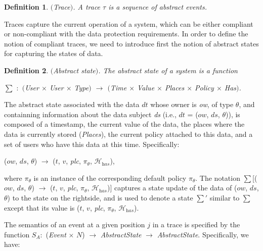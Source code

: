 \documentclass[a4paper]{article}
\newtheorem{ttd}{Definition}
\begin{document}
\begin{ttd} $($Trace$)$. 
A trace $\tau$ is a sequence of abstract events.  
\end{ttd}

Traces capture the current operation of a system, which can be either compliant or non-compliant with the data protection requirements.     
In order to define the notion of compliant traces, we need to introduce first the notion of abstract states for capturing the states of data.        

\begin{ttd} $($Abstract state$)$.
The abstract state of a system is a function 

\noindent $\sum$ $:$ $($\textit{User} $\times$ \textit{User} $\times$ \textit{Type}$)$ 
$\rightarrow$ $($\textit{Time} $\times$ \textit{Value} $\times$ \textit{Places} $\times$ \textit{Policy} $\times$ \textit{Has}$)$. 
\end{ttd}

The abstract state associated with the data $dt$ whose owner is \textit{ow}, of type $\theta$, and containning information about the data subject \textit{ds} (i.e., $dt$ = ($ow$, $ds$, $\theta$)), is composed of a timestamp, the current value of the data, the places where the data is currently stored (\textit{Places}), the current policy attached to this data, and a set of users who have this data at this time. Specifically:  

\begin{center} 
($ow$, $ds$, $\theta$) $\rightarrow$ ($t$, $v$, \textit{plc}, $\pi_{\theta}$, $\mathcal{H}_{\textit{has}}$), 
\end{center} 

where $\pi_{\theta}$ is an instance of the corresponding default policy $\pi_{\theta}$. The notation $\sum$[($ow$, $ds$, $\theta$) $\rightarrow$ ($t$, $v$, \textit{plc}, $\pi_{\theta}$, $\mathcal{H}_{\textit{has}}$)] captures a state update of the data of ($ow$, $ds$, $\theta$) to the state on the rightside, and is 
used to denote a state $\sum'$ similar to $\sum$ except that its value is  
($t$, $v$, \textit{plc}, $\pi_{\theta}$, $\mathcal{H}_{\textit{has}}$).  

The semantics of an event at a given 
position $j$ in a trace is specified by the function $S_A$$:$ (\textit{Event} $\times$ $N$) $\rightarrow$ 
\textit{AbstractState} $\rightarrow$ \textit{AbstractState}. Specifically, we have:  
\end{document}
